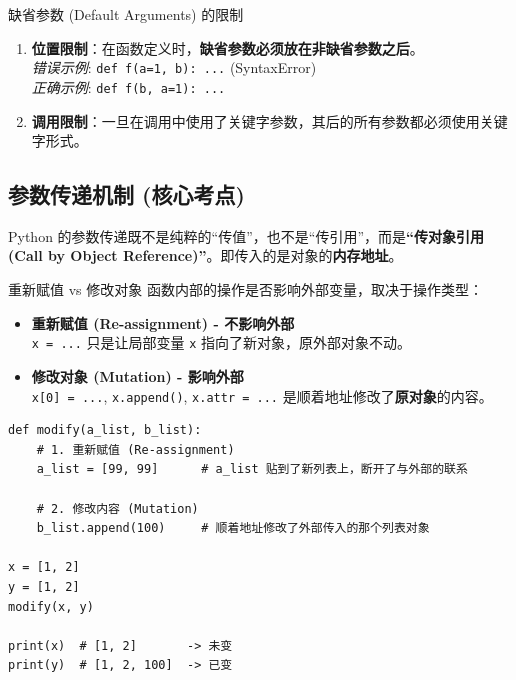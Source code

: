 \documentclass[12pt, a4paper]{article}
\begin{document}
\begin{importantbox}{缺省参数 (Default Arguments) 的限制}
\begin{enumerate}
    \item \textbf{位置限制}：在函数定义时，\textbf{缺省参数必须放在非缺省参数之后}。
    \\ \textit{错误示例}: \texttt{def f(a=1, b): ...} (SyntaxError)
    \\ \textit{正确示例}: \texttt{def f(b, a=1): ...}
    \item \textbf{调用限制}：一旦在调用中使用了关键字参数，其后的所有参数都必须使用关键字形式。
\end{enumerate}
\end{importantbox}

\subsection{参数传递机制 (核心考点)}

Python 的参数传递既不是纯粹的“传值”，也不是“传引用”，而是\textbf{“传对象引用 (Call by Object Reference)”}。即传入的是对象的\textbf{内存地址}。

\begin{trapbox}{重新赋值 vs 修改对象}
函数内部的操作是否影响外部变量，取决于操作类型：
\begin{itemize}
    \item \textbf{重新赋值 (Re-assignment) - 不影响外部}
    \\ \texttt{x = ...} 只是让局部变量 \texttt{x} 指向了新对象，原外部对象不动。
    
    \item \textbf{修改对象 (Mutation) - 影响外部}
    \\ \texttt{x[0] = ...}, \texttt{x.append()}, \texttt{x.attr = ...} 是顺着地址修改了\textbf{原对象}的内容。
\end{itemize}
\end{trapbox}

\begin{lstlisting}[caption={修改外部对象的对比}]
def modify(a_list, b_list):
    # 1. 重新赋值 (Re-assignment)
    a_list = [99, 99]      # a_list 贴到了新列表上，断开了与外部的联系
    
    # 2. 修改内容 (Mutation)
    b_list.append(100)     # 顺着地址修改了外部传入的那个列表对象

x = [1, 2]
y = [1, 2]
modify(x, y)

print(x)  # [1, 2]       -> 未变
print(y)  # [1, 2, 100]  -> 已变
\end{lstlisting}
\end{document}
